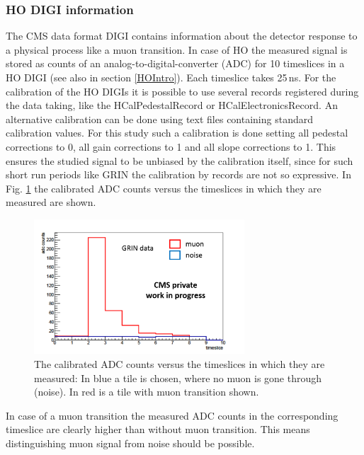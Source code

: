 		\subsubsection{HO DIGI information}
			The CMS data format DIGI contains information about the detector response to a physical process like a muon transition.
			In case of HO the measured signal is stored as counts of an analog-to-digital-converter (ADC) for 10 timeslices in a HO DIGI (see also in section \ref{HOIntro}).
			Each timeslice takes 25\,ns.
			For the calibration of the HO DIGIs it is possible to use several records registered during the data taking, like the HCalPedestalRecord or HCalElectronicsRecord.
			An alternative calibration can be done using text files containing standard calibration values.
			For this study such a calibration is done setting all pedestal corrections to 0, all gain corrections to 1 and all slope corrections to 1.
			This ensures the studied signal to be unbiased by the calibration itself, since for such short run periods like GRIN the calibration by records are not so expressive.
			In Fig. \ref{fig:adc_vs_ts} the calibrated ADC counts versus the timeslices in which they are measured are shown.
			\begin{figure}[htbp]
				\centering
				\includegraphics[width=0.70\textwidth]{Figures/erdogan/adc_vs_ts.png}
				\caption{The calibrated ADC counts versus the timeslices in which they are measured: In blue a tile is chosen, where no muon is gone through (noise). In red is a tile with muon transition shown.}
				\label{fig:adc_vs_ts}
			\end{figure}
			In case of a muon transition the measured ADC counts in the corresponding timeslice are clearly higher than without muon transition.
			This means distinguishing muon signal from noise should be possible.

